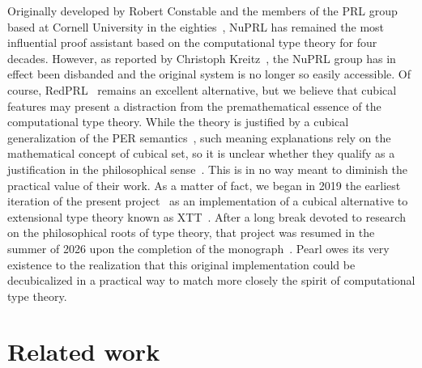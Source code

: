\documentclass[a4paper]{article}
\begin{document}
Originally developed by Robert Constable and the members of the PRL group based at Cornell University in the eighties~\cite{nuprl}, NuPRL has remained the most influential proof assistant based on the computational type theory for four decades. However, as reported by Christoph Kreitz~\cite{kreitz2023answer}, the NuPRL group has in effect been disbanded and the original system is no longer so easily accessible. 
Of course, RedPRL~\cite{angiuli2018redprl} remains an excellent alternative, but we believe that cubical features may present a distraction from the premathematical essence of the computational type theory. While the theory is justified by a cubical generalization of the PER semantics~\cite{angiuli2018meaning}, such meaning explanations rely on the mathematical concept of cubical set, so it is unclear whether they qualify as a justification in the philosophical sense~\cite{bentzen2019what,bentzen2026book}. This is in no way meant to diminish the practical value of their work. As a matter of fact, we began in 2019 the earliest iteration of the present project~\cite{cube} as an implementation of a cubical alternative to extensional type theory known as XTT~\cite{sterling2019xtt}. After a long break devoted to research on the philosophical roots of  type theory, that project was resumed in the summer of 2026 upon the completion of the monograph~\cite{bentzen2026book}. Pearl owes its very existence to the realization that this original implementation could be decubicalized in a practical way to match more closely the spirit of computational type theory.

%
%

\section{Related work} \label{sec:relatedwork}
\end{document}
